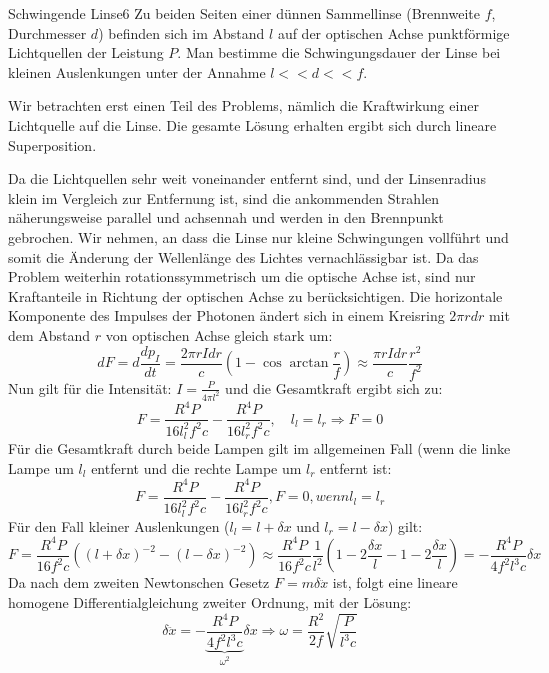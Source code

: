 \begin{problem}{Schwingende Linse}{6}
Zu beiden Seiten einer dünnen Sammellinse (Brennweite $f$, Durchmesser $d$) befinden sich im Abstand $l$ auf der optischen Achse punktförmige Lichtquellen der Leistung $P$. Man bestimme die Schwingungsdauer der Linse bei kleinen Auslenkungen unter der Annahme $l<<d<<f$.
\begin{solution}
Wir betrachten erst einen Teil des Problems, nämlich die Kraftwirkung einer Lichtquelle auf die Linse. Die gesamte Lösung erhalten ergibt sich durch lineare Superposition.
 
Da die Lichtquellen sehr weit voneinander entfernt sind, und der Linsenradius klein im Vergleich zur Entfernung ist, sind die ankommenden Strahlen näherungsweise parallel und achsennah und werden in den Brennpunkt gebrochen. Wir nehmen, an dass die Linse nur kleine Schwingungen vollführt und somit die Änderung der Wellenlänge des Lichtes vernachlässigbar ist. Da das Problem weiterhin rotationssymmetrisch um die optische Achse ist, sind nur Kraftanteile in Richtung der optischen Achse zu berücksichtigen. Die horizontale Komponente des Impulses der Photonen ändert sich in einem Kreisring $2\pi r dr$ mit dem Abstand $r$ von optischen Achse gleich stark um:
$$dF=d\frac{dp_I}{dt}=\frac{2\pi rIdr}{c}(1-\cos{\arctan\frac{r}{f}})\approx\frac{\pi rIdr}{c}\frac{r^2}{f^2}$$
Nun gilt für die Intensität: $I=\frac{P}{4\pi l^2}$ und die Gesamtkraft ergibt sich zu:
$$F=\frac{R^4P}{16l_l^2f^2c}-\frac{R^4P}{16l_r^2f^2c},\quad l_l=l_r \Rightarrow F=0$$
Für die Gesamtkraft durch beide Lampen gilt im allgemeinen Fall (wenn die linke Lampe um $l_l$ entfernt und die rechte Lampe um $l_r$ entfernt ist:
$$F=\frac{R^4P}{16l_l^2f^2c}-\frac{R^4P}{16l_r^2f^2c}, F=0, wenn l_l=l_r$$
Für den Fall kleiner Auslenkungen ($l_l=l+\delta x$ und $l_r=l-\delta x$) gilt:
$$F=\frac{R^4P}{16f^2c}\left((l+\delta x)^{-2}-(l-\delta x)^{-2}\right)\approx \frac{R^4P}{16f^2c}\frac 1{l^2}(1-2\frac{\delta x}l-1-2\frac{\delta x}l)=-\frac{R^4P}{4f^2l^3c}\delta x$$
Da nach dem zweiten Newtonschen Gesetz $F=m\delta\ddot{x}$ ist, folgt eine lineare homogene Differentialgleichung zweiter Ordnung, mit der Lösung:
$$\delta \ddot{x}=-\underbrace{\frac{R^4P}{4f^2l^3c}}_{\omega^2}\delta x \Rightarrow \omega=\frac{R^2}{2f}\sqrt{\frac{P}{l^3c}}$$
\end{solution}
\end{problem}

